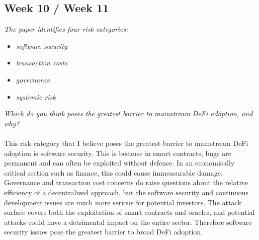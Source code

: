 \documentclass{article}
\theoremstyle{definition}
\begin{document}
\subsection{ Week 10 / Week 11}

\textit{The paper identifies four risk categories:}
\begin{itemize}
    \item \textit{software security}
    \item \textit{transaction costs}
    \item \textit{governance}
    \item \textit{systemic risk}
\end{itemize}
\textit{Which do you think poses the greatest barrier to mainstream DeFi adoption, and why?}
\\
\\
\noindent
This risk category that I believe poses the greatest barrier to mainstream DeFi
adoption is software security.
This is because in smart contracts, bugs are permanent and can often be exploited without defence.
In an economically critical section such as finance, this could cause immeasurable damage.
Governance and transaction cost concerns do raise questions about the relative efficiency of a decentralized approach,
but the software security and continuous development issues are much more serious for potential investors.
The attack surface covers both the exploitation of smart contracts and oracles,
and potential attacks could have a detrimental impact on the entire sector.
Therefore software security issues pose the greatest barrier to broad DeFi adoption.
\end{document}

